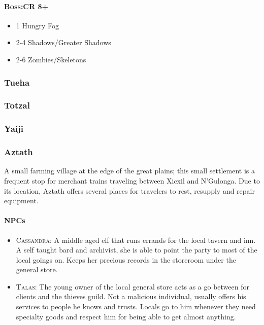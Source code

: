			\paragraph{\textsc{Boss}:CR 8+}
				\begin{itemize}
					\item 1 Hungry Fog
					\item 2-4 Shadows/Greater Shadows
					\item 2-6 Zombies/Skeletons
				\end{itemize}
			
	
		\subsubsection{Tueha}

		\subsubsection{Totzal}

		\subsubsection{Yaiji}

		\subsubsection{Aztath}

		A small farming village at the edge of the great plains; this small 
		settlement is a frequent stop for merchant trains traveling between 
		Xicxil and N'Gulonga.  Due to its location, Aztath offers several 
		places for travelers to rest, resupply and repair equipment.  

			\paragraph{NPCs}
			
				\begin{itemize}
					\item \textsc{Cassandra}: A middle aged elf that runs 
							errands for the local tavern and inn.
							A self taught bard and archivist, she
							is able to point the party to most of
							the local goings on.  Keeps her precious
							records in the storeroom under the
							general store. 
					\item \textsc{Talas}: The young owner of the local
							general store acts as a 
							go between for clients and the thieves 
							guild.  Not a malicious individual,
							usually offers his services to people he
							knows and trusts.  Locals go to him whenever 
							they need specialty goods and respect him
							for being able to get almost anything.  
				\end{itemize}

